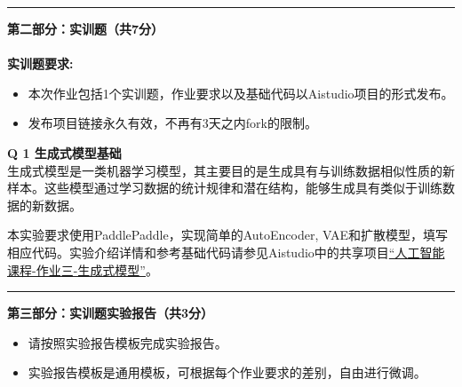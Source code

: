 \documentclass[a4paper, 11pt]{article}
\newenvironment{problem}[2][Q]
    { \begin{mdframed}[backgroundcolor=gray!20] \textbf{#1 #2} \\}
    {  \end{mdframed}}
\begin{document}
\begin{CJK}{UTF8}{gbsn}
\newpage
\noindent\rule{7in}{1pt}
\textbf{第二部分：实训题（共7分）}
\\ \\
\textbf{实训题要求:}
\begin{itemize}
    \item 本次作业包括1个实训题，作业要求以及基础代码以Aistudio项目的形式发布。
    \item 发布项目链接永久有效，不再有3天之内fork的限制。
\end{itemize}


\begin{problem}{1 生成式模型基础}

生成式模型是一类机器学习模型，其主要目的是生成具有与训练数据相似性质的新样本。这些模型通过学习数据的统计规律和潜在结构，能够生成具有类似于训练数据的新数据。

本实验要求使用PaddlePaddle，实现简单的AutoEncoder, VAE和扩散模型，填写相应代码。实验介绍详情和参考基础代码请参见Aistudio中的共享项目\href{https://aistudio.baidu.com/projectdetail/7517368}{“人工智能课程-作业三-生成式模型”}。

\end{problem}

\noindent\rule{7in}{1pt}
\textbf{第三部分：实训题实验报告（共3分）}
\begin{itemize}
    \item 请按照实验报告模板完成实验报告。
    \item 实验报告模板是通用模板，可根据每个作业要求的差别，自由进行微调。
\end{itemize}

\end{CJK}
\end{document}
